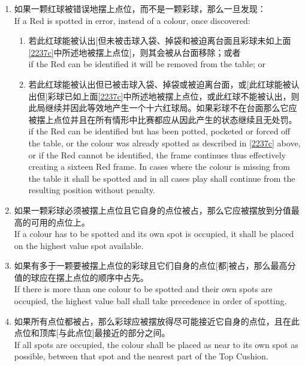 \begin{enumerate}[label=(\alph*)]
\begin{enumerate}[label=(\roman*)]
        \item 如果击球手在裁判曾能完成摆上点位前击打那么处罚。\\
        subject to penalty if the striker played before the referee was able to complete the spotting.
    \end{enumerate}
    \item 如果一颗红球被错误地摆上点位，而不是一颗彩球，那么一旦发现：\\
    If a Red is spotted in error, instead of a colour, once discovered:
    \begin{enumerate}[label=(\roman*)]
        \item 若此红球能被认出[但未被击球入袋、掉袋和被迫离台面且彩球未如上面\ref{2237c}中所述地被摆上点位]，则其会被从台面移除；或者\\
        if the Red can be identified it will be removed from the table; or
        \item 若此红球能被认出但已被击球入袋、掉袋或被迫离台面，或[此红球能被认出但]彩球已如上面\ref{2237c}中所述地被摆上点位，或此红球不能被认出，则此局继续并因此等效地产生一个十六红球局。如果彩球不在台面那么它应被摆上点位并且在所有情形中比赛都应从因此产生的状态继续且无处罚。\\
        if the Red can be identified but has been potted, pocketed or forced off the table, or the colour was already spotted as described in \ref{2237c} above, or if the Red cannot be identified, the frame continues thus effectively creating a sixteen Red frame. In cases where the colour is missing from the table it shall be spotted and in all cases play shall continue from the resulting position without penalty.
    \end{enumerate}
    \item 如果一颗彩球必须被摆上点位且它自身的点位被占，那么它应被摆放到分值最高的可用的点位上。\\
    If a colour has to be spotted and its own spot is occupied, it shall be placed on the highest value spot available.
    \item 如果有多于一颗要被摆上点位的彩球且它们自身的点位[都]被占，那么最高分值的球应在摆上点位的顺序中占先。\\
    If there is more than one colour to be spotted and their own spots are occupied, the highest value ball shall take precedence in order of spotting.
    \item 如果所有点位都被占，那么彩球应被摆放得尽可能接近它自身的点位，且在此点位和顶库[与此点位]最接近的部分之间。\\
    If all spots are occupied, the colour shall be placed as near to its own spot as possible, between that spot and the nearest part of the Top Cushion.

\end{enumerate}
